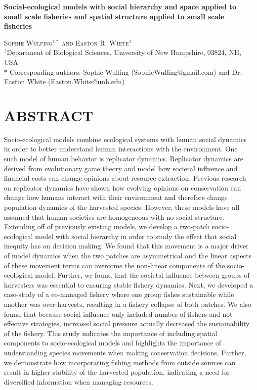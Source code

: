 \documentclass[
  12pt,
]{article}
\author{}
\date{\vspace{-2.5em}}
\begin{document}
\doublespacing

\begin{center}
    
\textbf{\Large Social-ecological models with social hierarchy and space applied to small scale fisheries and spatial structure applied to small scale fisheries}
    
\textsc{Sophie Wulfing$^{1*}$ and Easton R. White$^{1}$\\}
\vspace{3 mm}
\normalsize{\indent $^1$Department of Biological Sciences, University of New Hampshire, 03824, NH, USA\\}
$\text{*}$ Corresponding authors: Sophie Wulfing (SophieWulfing@gmail.com) and Dr. Easton White (Easton.White@unh.edu)
\end{center}

\newpage

\hypertarget{abstract}{%
\section{ABSTRACT}\label{abstract}}

Socio-ecological models combine ecological systems with human social dynamics in order to better understand human interactions with the environment. One such model of human behavior is replicator dynamics. Replicator dynamics are derived from evolutionary game theory and model how societal influence and financial costs can change opinions about resource extraction. Previous research on replicator dynamics have shown how evolving opinions on conservation can change how humans interact with their environment and therefore change population dynamics of the harvested species. However, these models have all assumed that human societies are homogeneous with no social structure. Extending off of previously existing models, we develop a two-patch socio-ecological model with social hierarchy in order to study the effect that social inequity has on decision making. We found that this movement is a major driver of model dynamics when the two patches are asymmetrical and the linear aspects of these movement terms can overcome the non-linear components of the socio-ecological model. Further, we found that the societal influence between groups of harvesters was essential to ensuring stable fishery dynamics. Next, we developed a case-study of a co-managed fishery where one group fishes sustainable while another was over-harvests, resulting in a fishery collapse of both patches. We also found that because social influence only included number of fishers and not effective strategies, increased social pressure actually decreased the sustainability of the fishery. This study indicates the importance of including spatial components to socio-ecological models and highlights the importance of understanding species movements when making conservation decisions. Further, we demonstrate how incorporating fishing methods from outside sources can result in higher stability of the harvested population, indicating a need for diversified information when managing resources.
\end{document}
